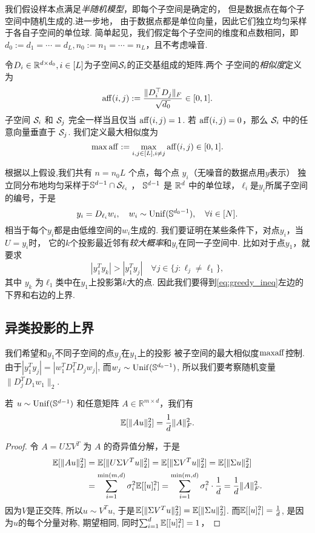 我们假设样本点满足\emph{半随机模型}，即每个子空间是确定的，
但是数据点在每个子空间中随机生成的.进一步地，
由于数据点都是单位向量，因此它们独立均匀采样于各自子空间的单位球.
简单起见，我们假定每个子空间的维度和点数相同，即\(d_0:= d_1=\cdots=d_L,
n_0:= n_1=\cdots=n_L\)，且不考虑噪音.

令\(D_i\in \R^{d\times d_0}, i\in [L]\)为子空间\(\cS_i\)的正交基组成的矩阵.两个
子空间的\emph{相似度}定义为
\begin{align*}
  \aff(i,j) := \frac{\|D_i^\top D_j\|_F}{\sqrt{d_0}} \in [0, 1].
\end{align*}
子空间 \(\cS_i\) 和 \(\cS_j\) 完全一样当且仅当 \(\aff(i,j) = 1\).
若 \(\aff(i,j) = 0\)，那么 \(\cS_i\) 中的任意向量垂直于 \(\cS_j\).
我们定义最大相似度为
\[ \max \aff := \max_{i,j \in [L], i \neq j} \aff(i,j) \in [0,1].\]

根据以上假设,我们共有 \(n = n_0 L\) 个点，每个点 \(y_i\)（无噪音的数据点用\(y\)表示）
独立同分布地均匀采样于\(\S^{d-1} \cap \cS_{\ell_i}\) ，
\(\S^{d-1}\) 是 \(\R^d\) 中的单位球，\(\ell_i\)是\(y_i\)所属子空间的编号，于是
\[
  y_i = D_{\ell_i} w_i ,\quad w_i \sim \Unif(\S^{d_0-1}) ,\quad
  \forall i \in [N].
\]
相当于每个\(y_i\)都是由低维空间的\(w_i\)生成的.
我们要证明在某些条件下，对点\(y_i\)，当\(U=y_i\)时，
它的\(k\)个投影最近邻有\emph{较大概率}和\(y_i\)在同一子空间中.
比如对于点\(y_1\)，就要求
\begin{equation}
  |y_1^T y_k|>|y_1^T y_j| \quad \forall j \in \{j:\ell_j \ne \ell_1\},
  \label{eq:greedy_ineq}
\end{equation}
其中 \(y_k\) 为\(\ell_1\)类中在\(y_1\)上投影第\(k\)大的点.
因此我们要得到\eqref{eq:greedy_ineq}左边的下界和右边的上界.

\subsection{异类投影的上界}
我们希望和\(y_1\)不同子空间的点\(y_j\)在\(y_1\)上的投影
被子空间的最大相似度\(\maff\)控制.
由于\(|y_1^T y_j| = |w_1^T D_1^T D_j w_j|\), 而\(w_j \sim \Unif(\S^{d_0-1})\),
所以我们要考察随机变量\(\|D_j^T D_1 w_1\|_2\).

\begin{lemma} \label{lem:expectation}
  若 \(u \sim \Unif(\mathbb{S}^{d-1})\) 和任意矩阵 
  \(A \in \mathbb{R}^{m \times d}\)，我们有
  \[ \E[\|Au\|_2^2] = \frac{1}{d} \|A\|_F^2. \]
\end{lemma}
\begin{proof}
令 \(A = U \Sigma V^T\) 为 \(A\) 的奇异值分解，于是
\begin{align*}
  \E[\|Au\|_2^2] &= \E[\|U \Sigma V^T u\|_2^2]= \E[\|\Sigma V^Tu\|_2^2] 
  = \E[\|\Sigma u\|_2^2]\\
  &= \sum_{i=1}^{\min(m,d)} \sigma_i^2 \E[ [u]_i^2] 
  = \sum_{i=1}^{\min(m,d)} \sigma_i^2 \cdot \frac{1}{d} = \frac{1}{d} \|A\|_F^2.
\end{align*}
因为\(V\)是正交阵, 所以\(u\sim V^T u\), 于是\(\E[\|\Sigma V^Tu\|_2^2]
=\E[\|\Sigma u\|_2^2]\). 而\(\E[[u]_i^2] = \frac{1}{d}\), 
是因为\(u\)的每个分量对称, 期望相同, 同时\(\sum_{i=1}^d \E[ [u]_i^2] = 1 \)，
\end{proof}


